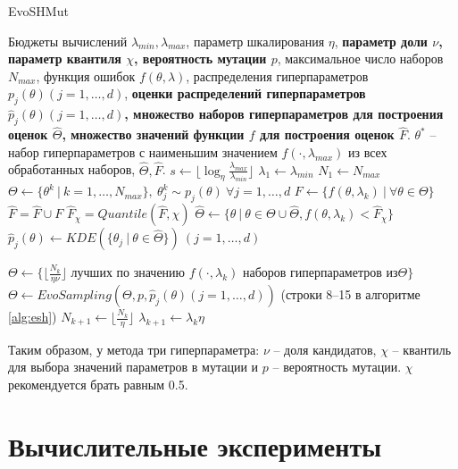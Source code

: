 \documentclass[a4paper,12pt]{article}
\begin{document}
\begin{algorithm}[H]
    \caption{EvoSHMut}\label{alg:eshmut}
  \begin{algorithmic}[1]
    \INPUT Бюджеты вычислений $\lambda_{min}, \lambda_{max}$, параметр шкалирования $\eta$, \textbf{параметр доли $\nu$, параметр квантиля $\chi$, вероятность мутации $p$}, максимальное число наборов $N_{max}$, функция ошибок $f(\theta, \lambda)$, распределения гиперпараметров $p_{j}(\theta) (j = 1,\dots,d)$,  \textbf{оценки распределений гиперпараметров $\hat{p}_{j}(\theta) (j = 1,\dots,d)$, множество наборов гиперпараметров для построения оценок $\hat{\Theta}$, множество значений функции $f$ для построения оценок $\hat{F}$}.
    \OUTPUT $\theta^*$ -- набор гиперпараметров с наименьшим значением $f(\cdot, \lambda_{max})$ из всех обработанных наборов, $\hat{\Theta}, \hat{F}$.
    \STATE $s \gets \lfloor \log_{\eta} \frac{\lambda_{max}}{\lambda_{min}} \rfloor$
    \STATE $\lambda_{1} \gets \lambda_{min}$
    \STATE $N_{1} \gets N_{max}$
    \STATE $\Theta \gets \{\theta^k\ |\ k = 1,\dots,N_{max}\},\ \theta^k_j \sim p_j(\theta)\ \forall j = 1,\dots,d$
        \STATE $F \gets \{f(\theta, \lambda_k)\ |\ \forall \theta \in \Theta\}$
        \STATE $\hat{F} = \hat{F} \cup F$
        \STATE $\hat{F}_\chi = Quantile(\hat{F}, \chi)$
        \STATE $\hat{\Theta} \gets \{\theta\ |\ \theta \in \Theta \cup \hat{\Theta}, f(\theta, \lambda_k) < \hat{F}_\chi\}$
        \STATE $\hat{p}_j(\theta) \gets KDE(\{\theta_j\ |\ \theta \in \hat{\Theta}\})\ (j = 1,\dots,d)$

        
        \STATE $\Theta \gets \{\lfloor \frac{N_k}{\eta\nu} \rfloor \text{ лучших по значению } f(\cdot, \lambda_k) \text{ наборов гиперпараметров из} \Theta\}$
        \STATE $\Theta \gets EvoSampling(\Theta, p, \hat{p}_{j}(\theta) (j = 1,\dots,d))$ (строки 8--15 в алгоритме \ref{alg:esh})
        \STATE $N_{k+1} \gets \lfloor \frac{N_k}{\eta} \rfloor$
        \STATE $\lambda_{k+1} \gets \lambda_k\eta$

        
    \ENDFOR
  \end{algorithmic}

\end{algorithm}


Таким образом, у метода три гиперпараметра: $\nu$ -- доля кандидатов, $\chi$ -- квантиль для выбора значений параметров в мутации и $p$ -- вероятность мутации. $\chi$ рекомендуется брать равным 0.5.

\section{Вычислительные эксперименты}
\end{document}
